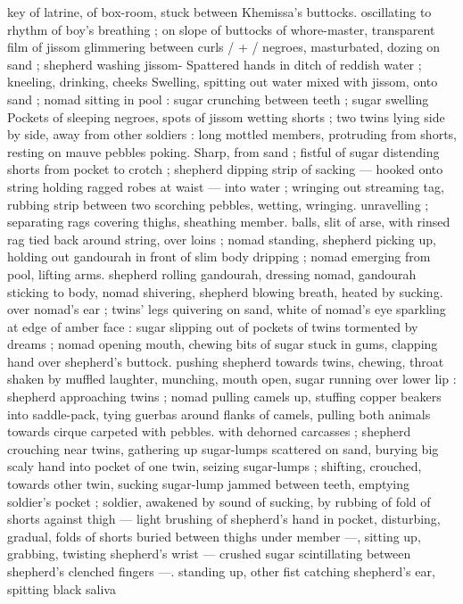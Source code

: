 {key of latrine, of box-room, stuck between Khemissa's buttocks. 
oscillating to rhythm of boy's breathing ; on slope of buttocks of 
whore-master, transparent film of jissom glimmering between curls {\slash} 
+ {\slash} negroes, masturbated, dozing on sand ; shepherd washing jissom- 
Spattered hands in ditch of reddish water ; kneeling, drinking, cheeks 
Swelling, spitting out water mixed with jissom, onto sand ; nomad 
sitting in pool : sugar crunching between teeth ; sugar swelling 
Pockets of sleeping negroes, spots of jissom wetting shorts ; two 
twins lying side by side, away from other soldiers : long mottled 
members, protruding from shorts, resting on mauve pebbles poking. 
Sharp, from sand ; fistful of sugar distending shorts from pocket to 
crotch ; shepherd dipping strip of sacking --- hooked onto string 
holding ragged robes at waist --- into water ; wringing out streaming 
tag, rubbing strip between two scorching pebbles, wetting, wringing. 
unravelling ; separating rags covering thighs, sheathing member. 
balls, slit of arse, with rinsed rag tied back around string, over loins 
; nomad standing, shepherd picking up, holding out gandourah in 
front of slim body dripping ; nomad emerging from pool, lifting arms. 
shepherd rolling gandourah, dressing nomad, gandourah sticking to 
body, nomad shivering, shepherd blowing breath, heated by sucking. 
over nomad's ear ; twins' legs quivering on sand, white of nomad's 
eye sparkling at edge of amber face : sugar slipping out of pockets 
of twins tormented by dreams ; nomad opening mouth, chewing bits 
of sugar stuck in gums, clapping hand over shepherd's buttock. 
pushing shepherd towards twins, chewing, throat shaken by muffled 
laughter, munching, mouth open, sugar running over lower lip : 
shepherd approaching twins ; nomad pulling camels up, stuffing 
copper beakers into saddle-pack, tying guerbas around flanks of 
camels, pulling both animals towards cirque carpeted with pebbles. 
with dehorned carcasses ; shepherd crouching near twins, gathering 
up sugar-lumps scattered on sand, burying big scaly hand into 
pocket of one twin, seizing sugar-lumps ; shifting, crouched, towards 
other twin, sucking sugar-lump jammed between teeth, emptying 
soldier's pocket ; soldier, awakened by sound of sucking, by rubbing 
of fold of shorts against thigh --- light brushing of shepherd's hand 
in pocket, disturbing, gradual, folds of shorts buried between thighs 
under member ---, sitting up, grabbing, twisting shepherd's wrist --- 
crushed sugar scintillating between shepherd's clenched fingers ---. 
standing up, other fist catching shepherd's ear, spitting black saliva 
}
